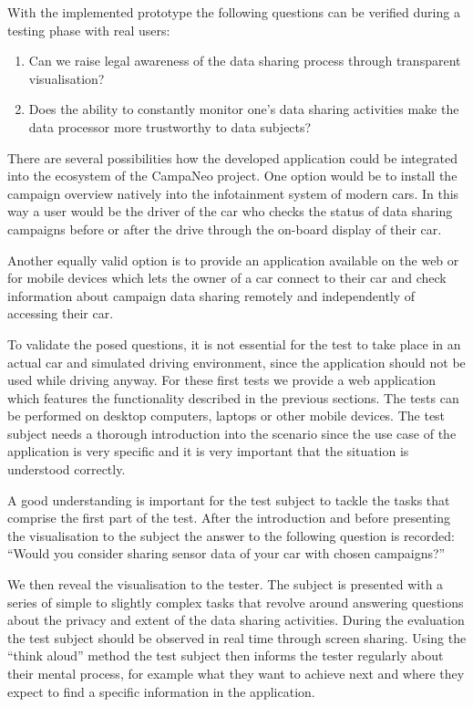 \documentclass[../paper.tex]{subfiles}
\begin{document}
  With the implemented prototype the following questions can be verified during a
  testing phase with real users:
  \begin{enumerate}
    \item Can we raise legal awareness of the data sharing process through
          transparent visualisation?
    \item Does the ability to constantly monitor one’s data sharing activities
          make the data processor more trustworthy to data subjects?
  \end{enumerate}
  There are several possibilities how the developed application could be
  integrated into the ecosystem of the CampaNeo project.
  One option would be to install the campaign overview natively into the
  infotainment system of modern cars. In this way a user would be the driver
  of the car who checks the status of data sharing campaigns before or after
  the drive through the on-board display of their car.

  Another equally valid option is to provide an application available
  on the web or for mobile devices which lets the owner of a car connect to
  their car and check information about campaign data sharing remotely and
  independently of accessing their car.

  To validate the posed questions, it is not essential for the test to
  take place in an actual car and simulated driving environment, since the
  application should not be used while driving anyway. For these first tests we
  provide a web application which features the functionality described in the
  previous sections. The tests can be performed on desktop computers, laptops
  or other mobile devices. The test subject needs a thorough introduction
  into the scenario since the use case of the application is very specific and
  it is very important that the situation is understood correctly.

  A good understanding is important for the test subject to tackle the
  tasks that comprise the first part of the test. After the introduction and
  before presenting the visualisation to the subject the answer to the
  following question is recorded: “Would you consider sharing sensor data
  of your car with chosen campaigns?”

  We then reveal the visualisation to the tester. The subject is presented with
  a series of simple to slightly complex tasks that revolve around answering
  questions about the privacy and extent of the data sharing activities.
  During the evaluation the test subject should be observed in real time
  through screen sharing. Using the “think aloud” method the test subject then
  informs the tester regularly about their mental process, for example what
  they want to achieve next and where they expect to find a specific information
  in the application.
\end{document}
